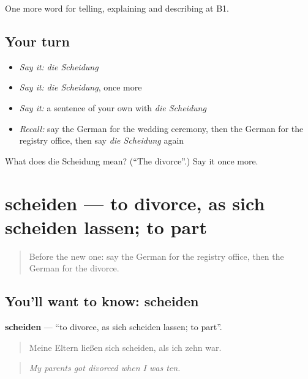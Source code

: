 \begin{grammarlens}[title={What you've built}]
One more word for telling, explaining and describing at B1.
\end{grammarlens}

\subsection*{Your turn}
\begin{itemize}
\raggedright
  \item \emph{Say it:} \emph{die Scheidung}
  \item \emph{Say it:} \emph{die Scheidung}, once more
  \item \emph{Say it:} a sentence of your own with \emph{die Scheidung}
  \item \emph{Recall:} say the German for the wedding ceremony, then the German for the registry office, then say \emph{die Scheidung} again
\end{itemize}

\begin{tcolorbox}[breakable,colback=teal!4,colframe=teal!35!black,title={Before you move on}]
What does die Scheidung mean? (\textquotedblleft{}The divorce\textquotedblright{}.) Say it once more.
\end{tcolorbox}
\section[scheiden]{scheiden — to divorce, as sich scheiden lassen; to part}

\label{lesson:GE-C300-scheiden}



\begin{quote}
Before the new one: say the German for the registry office, then the German for the divorce.
\end{quote}

\subsection*{You'll want to know: scheiden}
\textbf{scheiden} — \textquotedblleft{}to divorce, as sich scheiden lassen; to part\textquotedblright{}.

\begin{quote}
Meine Eltern ließen sich scheiden, als ich zehn war.
\end{quote}

\begin{quote}
\emph{My parents got divorced when I was ten.}
\end{quote}

